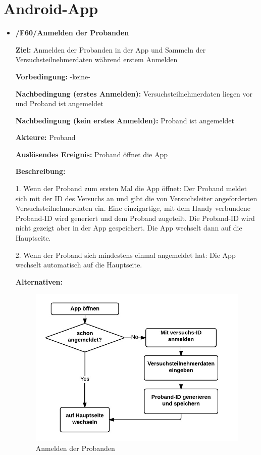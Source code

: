 \documentclass[a4paper]{scrreprt}
\begin{document}
    \newpage
    \section{Android-App}

        \begin{itemize}
            \item \textbf{/F60/Anmelden der Probanden}

                \par \textbf{Ziel: }Anmelden der Probanden in der App und Sammeln der Versuchsteilnehmerdaten während erstem Anmelden
                \par \textbf{Vorbedingung: }-keine-
                \par \textbf{Nachbedingung (erstes Anmelden): }Versuchsteilnehmerdaten liegen vor und Proband ist angemeldet
                \par \textbf{Nachbedingung (kein erstes Anmelden): }Proband ist angemeldet
                \par \textbf{Akteure: }Proband
                \par \textbf{Auslösendes Ereignis: }Proband öffnet die App
                \par \textbf{Beschreibung: }
                \par 1. Wenn der Proband zum ersten Mal die App öffnet: Der Proband meldet sich mit der ID des Versuchs an und gibt die
                 von Versuchsleiter angeforderten Versuchsteilnehmerdaten ein. Eine einzigartige, mit dem Handy verbundene Proband-ID wird generiert und dem Proband zugeteilt. Die Proband-ID wird nicht gezeigt aber in der App gespeichert. Die App wechselt dann auf die Hauptseite.
                \par 2. Wenn der Proband sich mindestens einmal angemeldet hat: Die App wechselt automatisch auf die Hauptseite.
                \par \textbf{Alternativen: }
                \begin{figure}[ht]
                    \centering
                    \includegraphics[scale=1]{AppAnmelden.jpeg}
                    \caption{Anmelden der Probanden}
                \end{figure}
                                


\end{itemize}
\end{document}
